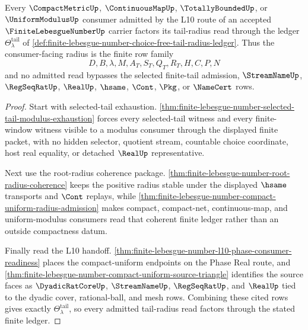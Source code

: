 \begin{theorem}
\label{thm:finite-lebesgue-number-choice-free-tail-radius-admission}
Every $\CompactMetricUp$, $\ContinuousMapUp$, $\TotallyBoundedUp$, or $\UniformModulusUp$ consumer admitted by the L10 route of an accepted $\FiniteLebesgueNumberUp$ carrier factors its tail-radius read through the ledger $\Theta_{\lambda}^{\mathrm{tail}}$ of \autoref{def:finite-lebesgue-number-choice-free-tail-radius-ledger}. Thus the consumer-facing radius is the finite row family
$$
D,B,\lambda,M,A_T,S_T,Q_T,R_T,H,C,P,N
$$
and no admitted read bypasses the selected finite-tail admission, $\StreamNameUp$, $\RegSeqRatUp$, $\RealUp$, $\hsame$, $\Cont$, $\Pkg$, or $\NameCert$ rows.
\end{theorem}
\begin{proof}
Start with selected-tail exhaustion. \autoref{thm:finite-lebesgue-number-selected-tail-modulus-exhaustion} forces every selected-tail witness and every finite-window witness visible to a modulus consumer through the displayed finite packet, with no hidden selector, quotient stream, countable choice coordinate, host real equality, or detached $\RealUp$ representative.

Next use the root-radius coherence package. \autoref{thm:finite-lebesgue-number-root-radius-coherence} keeps the positive radius stable under the displayed $\hsame$ transports and $\Cont$ replays, while \autoref{thm:finite-lebesgue-number-compact-uniform-radius-admission} makes compact, compact-net, continuous-map, and uniform-modulus consumers read that coherent finite ledger rather than an outside compactness datum.

Finally read the L10 handoff. \autoref{thm:finite-lebesgue-number-l10-phase-consumer-readiness} places the compact-uniform endpoints on the Phase Real route, and \autoref{thm:finite-lebesgue-number-compact-uniform-source-triangle} identifies the source faces as $\DyadicRatCoreUp$, $\StreamNameUp$, $\RegSeqRatUp$, and $\RealUp$ tied to the dyadic cover, rational-ball, and mesh rows. Combining these cited rows gives exactly $\Theta_{\lambda}^{\mathrm{tail}}$, so every admitted tail-radius read factors through the stated finite ledger.
\end{proof}

